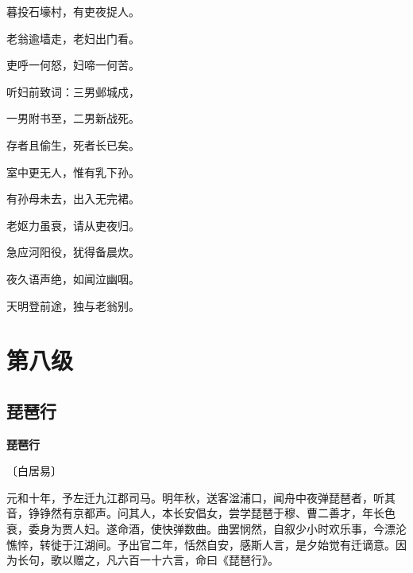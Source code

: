\documentclass[12pt,UTF-8,openany,fontset=none]{ctexbook}
\begin{document}
\begin{center}
    \begin{Large}

        暮投石壕村，有吏夜捉人。

        老翁逾墙走，老妇出门看。

        吏呼一何怒，妇啼一何苦。

        听妇前致词：三男邺城戍，

        一男附书至，二男新战死。

        存者且偷生，死者长已矣。

        室中更无人，惟有乳下孙。

        有孙母未去，出入无完裙。

        老妪力虽衰，请从吏夜归。

        急应河阳役，犹得备晨炊。

        夜久语声绝，如闻泣幽咽。

        天明登前途，独与老翁别。

    \end{Large}

\end{center}

\vspace{8pt}
\clearpage

\chapter{第八级}
\clearpage

\section{琵琶行}


\begin{center}
    {\bfseries 琵琶行}

    \vspace{18pt}

    \begin{large}\xuwen
        〔白居易〕
    \end{large}
    
\end{center}

    \vspace{12pt}\mbox{}

    \begin{large}\xuwen
        元和十年，予左迁九江郡司马。明年秋，送客湓浦口，闻舟中夜弹琵琶者，听其音，铮铮然有京都声。问其人，本长安倡女，尝学琵琶于穆、曹二善才，年长色衰，委身为贾人妇。遂命酒，使快弹数曲。曲罢悯然，自叙少小时欢乐事，今漂沦憔悴，转徙于江湖间。予出官二年，恬然自安，感斯人言，是夕始觉有迁谪意。因为长句，歌以赠之，凡六百一十六言，命曰《琵琶行》。
    \end{large}
\end{document}
